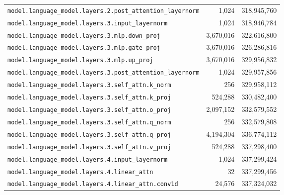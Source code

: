 \documentclass[10pt,a4paper]{article}
\theoremstyle{definition}
\begin{document}
\begin{appendices}
\begin{longtable}{p{9.5cm}rr}
\texttt{model.\allowbreak{}language\_model.\allowbreak{}layers.\allowbreak{}2.\allowbreak{}post\_attention\_layernorm} & 1,024 & 318,945,760 \\
\texttt{model.\allowbreak{}language\_model.\allowbreak{}layers.\allowbreak{}3.\allowbreak{}input\_layernorm} & 1,024 & 318,946,784 \\
\texttt{model.\allowbreak{}language\_model.\allowbreak{}layers.\allowbreak{}3.\allowbreak{}mlp.\allowbreak{}down\_proj} & 3,670,016 & 322,616,800 \\
\texttt{model.\allowbreak{}language\_model.\allowbreak{}layers.\allowbreak{}3.\allowbreak{}mlp.\allowbreak{}gate\_proj} & 3,670,016 & 326,286,816 \\
\texttt{model.\allowbreak{}language\_model.\allowbreak{}layers.\allowbreak{}3.\allowbreak{}mlp.\allowbreak{}up\_proj} & 3,670,016 & 329,956,832 \\
\texttt{model.\allowbreak{}language\_model.\allowbreak{}layers.\allowbreak{}3.\allowbreak{}post\_attention\_layernorm} & 1,024 & 329,957,856 \\
\texttt{model.\allowbreak{}language\_model.\allowbreak{}layers.\allowbreak{}3.\allowbreak{}self\_attn.\allowbreak{}k\_norm} & 256 & 329,958,112 \\
\texttt{model.\allowbreak{}language\_model.\allowbreak{}layers.\allowbreak{}3.\allowbreak{}self\_attn.\allowbreak{}k\_proj} & 524,288 & 330,482,400 \\
\texttt{model.\allowbreak{}language\_model.\allowbreak{}layers.\allowbreak{}3.\allowbreak{}self\_attn.\allowbreak{}o\_proj} & 2,097,152 & 332,579,552 \\
\texttt{model.\allowbreak{}language\_model.\allowbreak{}layers.\allowbreak{}3.\allowbreak{}self\_attn.\allowbreak{}q\_norm} & 256 & 332,579,808 \\
\texttt{model.\allowbreak{}language\_model.\allowbreak{}layers.\allowbreak{}3.\allowbreak{}self\_attn.\allowbreak{}q\_proj} & 4,194,304 & 336,774,112 \\
\texttt{model.\allowbreak{}language\_model.\allowbreak{}layers.\allowbreak{}3.\allowbreak{}self\_attn.\allowbreak{}v\_proj} & 524,288 & 337,298,400 \\
\texttt{model.\allowbreak{}language\_model.\allowbreak{}layers.\allowbreak{}4.\allowbreak{}input\_layernorm} & 1,024 & 337,299,424 \\
\texttt{model.\allowbreak{}language\_model.\allowbreak{}layers.\allowbreak{}4.\allowbreak{}linear\_attn} & 32 & 337,299,456 \\
\texttt{model.\allowbreak{}language\_model.\allowbreak{}layers.\allowbreak{}4.\allowbreak{}linear\_attn.\allowbreak{}conv1d} & 24,576 & 337,324,032 \\

\end{longtable}
\end{appendices}
\end{document}
